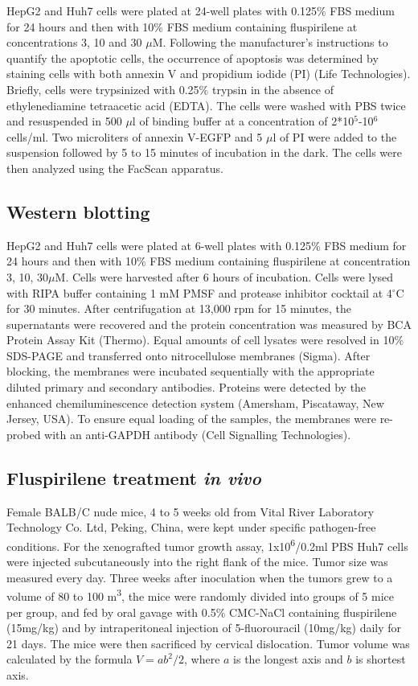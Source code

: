 \documentclass[10pt,letterpaper]{article}
\begin{document}
HepG2 and Huh7 cells were plated at 24-well plates with 0.125\% FBS medium for 24 hours and then with 10\% FBS medium containing fluspirilene at concentrations 3, 10 and 30 $\mu$M. Following the manufacturer's instructions to quantify the apoptotic cells, the occurrence of apoptosis was determined by staining cells with both annexin V and propidium iodide (PI) (Life Technologies). Briefly, cells were trypsinized with 0.25\% trypsin in the absence of ethylenediamine tetraacetic acid (EDTA). The cells were washed with PBS twice and resuspended in 500 $\mu$l of binding buffer at a concentration of 2*10$^5$-10$^6$ cells/ml. Two microliters of annexin V-EGFP and 5 $\mu$l of PI were added to the suspension followed by 5 to 15 minutes of incubation in the dark. The cells were then analyzed using the FacScan apparatus.

\subsection*{Western blotting}

HepG2 and Huh7 cells were plated at 6-well plates with 0.125\% FBS medium for 24 hours and then with 10\% FBS medium containing fluspirilene at concentration 3, 10, 30$\mu$M. Cells were harvested after 6 hours of incubation. Cells were lysed with RIPA buffer containing 1 mM PMSF and protease inhibitor cocktail at 4$^\circ$C for 30 minutes. After centrifugation at 13,000 rpm for 15 minutes, the supernatants were recovered and the protein concentration was measured by BCA Protein Assay Kit (Thermo). Equal amounts of cell lysates were resolved in 10\% SDS-PAGE and transferred onto nitrocellulose membranes (Sigma). After blocking, the membranes were incubated sequentially with the appropriate diluted primary and secondary antibodies. Proteins were detected by the enhanced chemiluminescence detection system (Amersham, Piscataway, New Jersey, USA). To ensure equal loading of the samples, the membranes were re-probed with an anti-GAPDH antibody (Cell Signalling Technologies).

\subsection*{Fluspirilene treatment \textit{in vivo}}

Female BALB/C nude mice, 4 to 5 weeks old from Vital River Laboratory Technology Co. Ltd, Peking, China, were kept under specific pathogen-free conditions. For the xenografted tumor growth assay, 1x10\textsuperscript{6}/0.2ml PBS Huh7 cells were injected subcutaneously into the right flank of the mice. Tumor size was measured every day. Three weeks after inoculation when the tumors grew to a volume of 80 to 100 m\textsuperscript{3}, the mice were randomly divided into groups of 5 mice per group, and fed by oral gavage with 0.5\% CMC-NaCl containing fluspirilene (15mg/kg) and by intraperitoneal injection of 5-fluorouracil (10mg/kg) daily for 21 days. The mice were then sacrificed by cervical dislocation. Tumor volume was calculated by the formula $V=ab^2/2$, where $a$ is the longest axis and $b$ is shortest axis.
\end{document}
